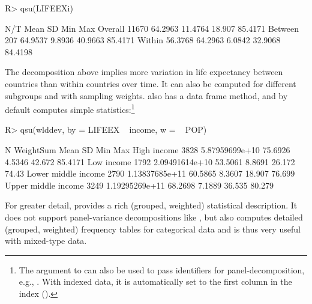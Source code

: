 \documentclass[nojss]{jss} %
\newcommand{\fct}[1]{\code{#1()}}
\begin{document}
%
\begin{Schunk}
\begin{Sinput}
R> qsu(LIFEEXi)
\end{Sinput}
\begin{Soutput}
             N/T     Mean       SD      Min      Max
Overall    11670  64.2963  11.4764   18.907  85.4171
Between      207  64.9537   9.8936  40.9663  85.4171
Within   56.3768  64.2963   6.0842  32.9068  84.4198
\end{Soutput}
\end{Schunk}
%
The decomposition above implies more variation in life expectancy between countries than within countries over time. It can also be computed for different subgroups and with sampling weights. \fct{qsu} also has a data frame method, and by default computes simple statistics:\footnote{The  argument to \fct{qsu} can also be used to pass identifiers for panel-decomposition, e.g., . With indexed data, it is automatically set to the first column in the index ().}
%
\begin{Schunk}
\begin{Sinput}
R> qsu(wlddev, by = LIFEEX ~ income, w = ~ POP)
\end{Sinput}
\begin{Soutput}
                        N       WeightSum     Mean      SD     Min      Max
High income          3828  5.87959699e+10  75.6926  4.5346  42.672  85.4171
Low income           1792  2.09491614e+10  53.5061  8.8691  26.172    74.43
Lower middle income  2790  1.13837685e+11  60.5865  8.3607  18.907   76.699
Upper middle income  3249  1.19295269e+11  68.2698  7.1889  36.535   80.279
\end{Soutput}
\end{Schunk}
%
For greater detail, \fct{descr} provides a rich (grouped, weighted) statistical description. It does not support panel-variance decompositions like \fct{qsu}, but also computes detailed (grouped, weighted) frequency tables for categorical data and is thus very useful with mixed-type data.
%
\end{document}
